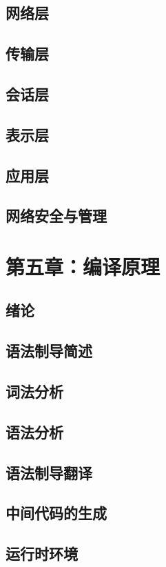 \documentclass[UTF8]{book}
\begin{document}
        \section{网络层}
        \section{传输层}
        \section{会话层}
        \section{表示层}
        \section{应用层}
        \section{网络安全与管理}
    \newpage
    \chapter{第五章：编译原理}
        \section{绪论}
        \section{语法制导简述}
        \section{词法分析}
        \section{语法分析}
        \section{语法制导翻译}
        \section{中间代码的生成}
        \section{运行时环境}
\end{document}
